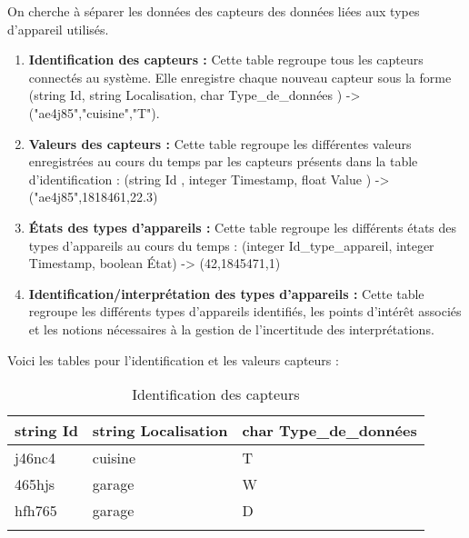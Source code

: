 \documentclass[10pt,a4paper]{article}
\begin{document}
On cherche à séparer les données des capteurs des données liées aux types d'appareil utilisés.
\begin{enumerate}
\item \textbf{Identification des capteurs :} Cette table regroupe tous les capteurs connectés au système. Elle enregistre chaque nouveau capteur sous la forme (string Id, string Localisation, char Type\_de\_données ) -> ("ae4j85","cuisine","T").
\item \textbf{Valeurs des capteurs :} Cette table regroupe les différentes valeurs enregistrées au cours 
du temps par les capteurs présents dans la table d'identification : (string Id , integer Timestamp, float Value ) -> ("ae4j85",1818461,22.3)
\item \textbf{États des types d'appareils : } Cette table regroupe les différents états des types d'appareils au cours du temps : (integer Id\_type\_appareil, integer Timestamp, boolean État) -> (42,1845471,1)
\item \textbf{Identification/interprétation des types d'appareils :} Cette table regroupe les différents types d'appareils identifiés, les points d'intérêt associés et les notions nécessaires à la gestion de l'incertitude des interprétations.
\end{enumerate}
\newpage
Voici les tables pour l'identification et les valeurs capteurs :
\begin{table}[h!]
    \centering
    \begin{tabular}{|l|l|l|}
    \hline
    \rowcolor[HTML]{EFEFEF} 
    string Id & string Localisation & char Type\_de\_données \\ \hline
    j46nc4    & cuisine             & T                      \\ \hline
    465hjs    & garage              & W                      \\ \hline
    hfh765    & garage              & D                      \\ \hline
              &                     &                       
    \end{tabular}
    \caption{Identification des capteurs}
\end{table}
\end{document}
